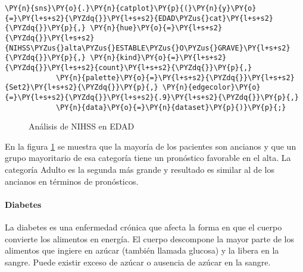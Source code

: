     \begin{tcolorbox}[breakable, size=fbox, boxrule=1pt, pad at break*=1mm,colback=cellbackground, colframe=cellborder]
\begin{Verbatim}[commandchars=\\\{\}]
\PY{n}{sns}\PY{o}{.}\PY{n}{catplot}\PY{p}{(}\PY{n}{y}\PY{o}{=}\PY{l+s+s2}{\PYZdq{}}\PY{l+s+s2}{EDAD\PYZus{}cat}\PY{l+s+s2}{\PYZdq{}}\PY{p}{,} \PY{n}{hue}\PY{o}{=}\PY{l+s+s2}{\PYZdq{}}\PY{l+s+s2}{NIHSS\PYZus{}alta\PYZus{}ESTABLE\PYZus{}O\PYZus{}GRAVE}\PY{l+s+s2}{\PYZdq{}}\PY{p}{,} \PY{n}{kind}\PY{o}{=}\PY{l+s+s2}{\PYZdq{}}\PY{l+s+s2}{count}\PY{l+s+s2}{\PYZdq{}}\PY{p}{,}
            \PY{n}{palette}\PY{o}{=}\PY{l+s+s2}{\PYZdq{}}\PY{l+s+s2}{Set2}\PY{l+s+s2}{\PYZdq{}}\PY{p}{,} \PY{n}{edgecolor}\PY{o}{=}\PY{l+s+s2}{\PYZdq{}}\PY{l+s+s2}{.9}\PY{l+s+s2}{\PYZdq{}}\PY{p}{,}
            \PY{n}{data}\PY{o}{=}\PY{n}{dataset}\PY{p}{)}\PY{p}{;}
\end{Verbatim}
\end{tcolorbox}

\begin{center}
    	\begin{figure}[H]
	\centering
	\caption{Análisis de NIHSS en EDAD}
	\label{fig:aNISSEdad}
	\end{figure}
\end{center}
    
    En la figura \ref{fig:aNISSEdad} se muestra que la mayoría de los pacientes son ancianos y que un grupo mayoritario de esa categoría tiene un pronóstico favorable en el alta. La categoría Adulto es la segunda más grande y resultado es similar al de los ancianos en términos de pronósticos.

    \hypertarget{diabetes}{%
\paragraph{Diabetes}\label{diabetes}}

La diabetes es una enfermedad crónica que afecta la forma en que el cuerpo convierte los alimentos en energía. El cuerpo descompone la mayor parte de los alimentos que ingiere en azúcar (también llamada glucosa) y la libera en la sangre. Puede existir exceso de azúcar o ausencia de azúcar en la sangre.

